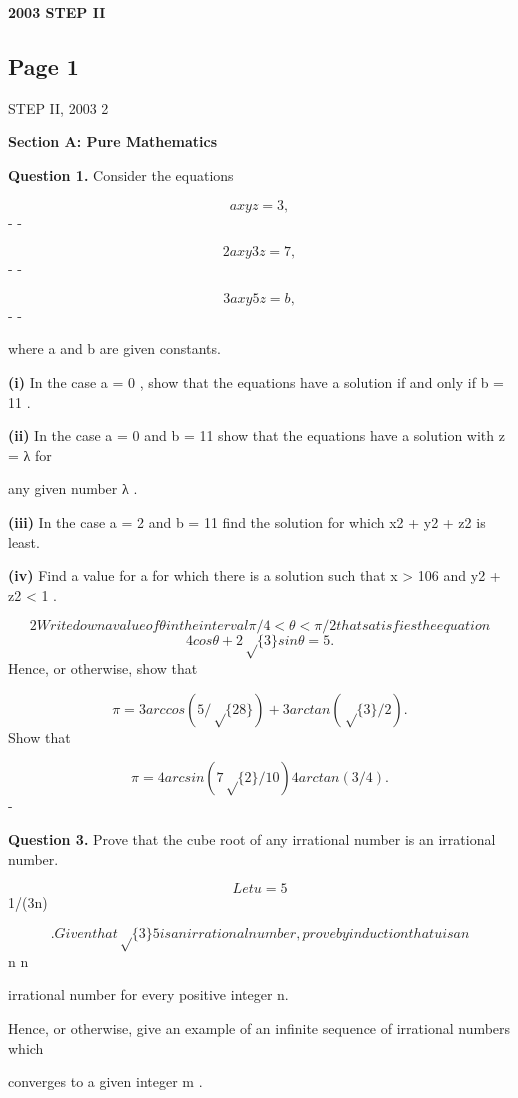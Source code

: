 \documentclass[12pt]{article}
\begin{document}
\begin{center}
{\Large \textbf{2003 STEP II}}
\end{center}

\subsection*{Page 1}
\begin{flushleft}
STEP II, 2003 2\par
\bigskip\textbf{Section A: Pure Mathematics}\par
\bigskip\textbf{Question 1.} Consider the equations\par
\[ax y z = 3 ,\]
- -\par
\[2ax y 3z = 7 ,\]
- -\par
\[3ax y 5z = b ,\]
- -\par
where a and b are given constants.\par
\textbf{(i)} In the case a = 0 , show that the equations have a solution if and only if b = 11 .\par
\textbf{(ii)} In the case a = 0 and b = 11 show that the equations have a solution with z = λ for\par
any given number λ .\par
\textbf{(iii)} In the case a = 2 and b = 11 find the solution for which x2 + y2 + z2 is least.\par
\textbf{(iv)} Find a value for a for which there is a solution such that x > 106 and y2 + z2 < 1 .\par
\[2 Write down a value of θ in the interval \pi/4 < θ < \pi/2 that satisfies the equation\]
\[4 cos θ + 2\sqrt\{3\} sin θ = 5 .\]
Hence, or otherwise, show that\par
\[\pi = 3 arccos(5/\sqrt\{28\}) + 3 arctan(\sqrt\{3\}/2) .\]
Show that\par
\[\pi = 4 arcsin(7\sqrt\{2\}/10) 4 arctan(3/4) .\]
-\par
\bigskip\textbf{Question 3.} Prove that the cube root of any irrational number is an irrational number.\par
\[Let u = 5\]
1/(3n)\par
\[. Given that \sqrt\{3\} 5 is an irrational number, prove by induction that u is an\]
n n\par
irrational number for every positive integer n.\par
Hence, or otherwise, give an example of an infinite sequence of irrational numbers which\par
converges to a given integer m .\par
[An irrational number is a number that cannot be expressed as the ratio of two integers.]\par
\end{flushleft}
\end{document}
